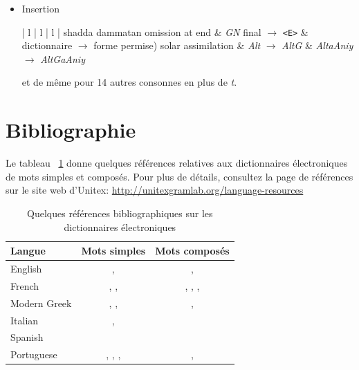 \begin{itemize}
\item Insertion
    \begin{longtable}{| l | l | l | }\hline
      {\small shadda dammatan omission at end}	& \textit{GN} final $\rightarrow$ \verb$<E>$ & {\small  dictionnaire $\rightarrow$ forme permise)} \kill
      {\small solar assimilation}	& \textit{Alt} $\rightarrow$ \textit{AltG} & \textit{AltaAniy} $\rightarrow$ \textit{AltGaAniy} \\\hline
    \end{longtable}
 \vspace{-3mm}    et de même pour 14 autres consonnes en plus de \textit{t}.
\end{itemize}



\section{Bibliographie}

Le tableau ~\ref{ref-dicos} donne quelques références relatives aux dictionnaires électroniques de
mots simples et composés. Pour plus de détails, consultez la page de références sur le site
web d’Unitex: \url{http://unitexgramlab.org/language-resources}

\bigskip
\begin{table}[!ht]
\begin{center}
\begin{tabular}{|l|c|c|}
\hline
\textbf{Langue} & \textbf{Mots simples} & \textbf{Mots composés} \\
\hline
English & \cite{klarsfeld}, \cite{monceaux-1995} & \cite{delac-anglais},
\cite{these-Savary} \\
\hline
French & \cite{formes-ambigues}, \cite{dicos-francais}, \cite{jacques-1995} & \cite{dicos-francais},
\cite{Gross96},
\cite{max-1993},
\cite{syntaxe-de-ladverbe} \\
\hline
Modern Greek & \cite{modern-greek}, \cite{matthieu-anastasia}, \cite{these-tita} & \cite{tita-2002},
\cite{anastasia-2002} \\
\hline
Italian & \cite{delaf-italien}, \cite{delaf-italien-book} & \cite{composes-italien} \\
\hline
Spanish & \cite{blanco-2000} & \cite{blanco-1997} \\
\hline
Portuguese & \cite{eleuterio1995}, \cite{ranchhod1996b}, \cite{ranchhodd1998},
\cite{muniz2005} & \cite{ranchhod1991}, \cite{ranchhodd1998} \\
\hline
\end{tabular}
\caption{Quelques références bibliographiques sur les dictionnaires électroniques\label{ref-dicos}}
\end{center}
\end{table}
